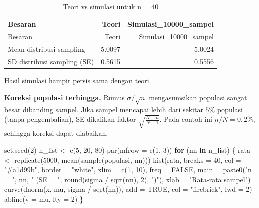 \documentclass[
  indonesian,
  letterpaper,
]{book}
\newenvironment{Shaded}{\begin{snugshade}}{\end{snugshade}}
\newcommand{\AttributeTok}[1]{\textcolor[rgb]{0.40,0.45,0.13}{#1}}
\newcommand{\ConstantTok}[1]{\textcolor[rgb]{0.56,0.35,0.01}{#1}}
\newcommand{\ControlFlowTok}[1]{\textcolor[rgb]{0.00,0.23,0.31}{\textbf{#1}}}
\newcommand{\DecValTok}[1]{\textcolor[rgb]{0.68,0.00,0.00}{#1}}
\newcommand{\FunctionTok}[1]{\textcolor[rgb]{0.28,0.35,0.67}{#1}}
\newcommand{\NormalTok}[1]{\textcolor[rgb]{0.00,0.23,0.31}{#1}}
\newcommand{\OtherTok}[1]{\textcolor[rgb]{0.00,0.23,0.31}{#1}}
\newcommand{\SpecialCharTok}[1]{\textcolor[rgb]{0.37,0.37,0.37}{#1}}
\newcommand{\StringTok}[1]{\textcolor[rgb]{0.13,0.47,0.30}{#1}}
\begin{document}
\begin{longtable}[]{@{}lrr@{}}
\caption{Teori vs simulasi untuk n = 40}\tabularnewline
\toprule\noalign{}
Besaran & Teori & Simulasi\_10000\_sampel \\
\midrule\noalign{}
\endfirsthead
\toprule\noalign{}
Besaran & Teori & Simulasi\_10000\_sampel \\
\midrule\noalign{}
\endhead
\bottomrule\noalign{}
\endlastfoot
Mean distribusi sampling & 5.0097 & 5.0024 \\
SD distribusi sampling (SE) & 0.5615 & 0.5556 \\
\end{longtable}

Hasil simulasi hampir persis sama dengan teori.

\textbf{Koreksi populasi terhingga.} Rumus \(\sigma/\sqrt{n}\)
mengasumsikan populasi sangat besar dibanding sampel. Jika sampel
mencapai lebih dari sekitar \(5\%\) populasi (tanpa pengembalian), SE
dikalikan faktor \(\sqrt{\frac{N-n}{N-1}}\). Pada contoh ini
\(n/N = 0,2\%\), sehingga koreksi dapat diabaikan.

\begin{Shaded}
\begin{Highlighting}[]
\FunctionTok{set.seed}\NormalTok{(}\DecValTok{2}\NormalTok{)}
\NormalTok{n\_list }\OtherTok{\textless{}{-}} \FunctionTok{c}\NormalTok{(}\DecValTok{5}\NormalTok{, }\DecValTok{20}\NormalTok{, }\DecValTok{80}\NormalTok{)}
\FunctionTok{par}\NormalTok{(}\AttributeTok{mfrow =} \FunctionTok{c}\NormalTok{(}\DecValTok{1}\NormalTok{, }\DecValTok{3}\NormalTok{))}
\ControlFlowTok{for}\NormalTok{ (nn }\ControlFlowTok{in}\NormalTok{ n\_list) \{}
\NormalTok{rata }\OtherTok{\textless{}{-}} \FunctionTok{replicate}\NormalTok{(}\DecValTok{5000}\NormalTok{, }\FunctionTok{mean}\NormalTok{(}\FunctionTok{sample}\NormalTok{(populasi, nn)))}
\FunctionTok{hist}\NormalTok{(rata, }\AttributeTok{breaks =} \DecValTok{40}\NormalTok{, }\AttributeTok{col =} \StringTok{"\#a1d99b"}\NormalTok{, }\AttributeTok{border =} \StringTok{"white"}\NormalTok{, }\AttributeTok{xlim =} \FunctionTok{c}\NormalTok{(}\DecValTok{1}\NormalTok{, }\DecValTok{10}\NormalTok{), freq}
\OtherTok{=} \ConstantTok{FALSE}\NormalTok{,}
\AttributeTok{main =} \FunctionTok{paste0}\NormalTok{(}\StringTok{"n = "}\NormalTok{, nn, }\StringTok{" (SE = "}\NormalTok{, }\FunctionTok{round}\NormalTok{(sigma }\SpecialCharTok{/} \FunctionTok{sqrt}\NormalTok{(nn), }\DecValTok{2}\NormalTok{), }\StringTok{")"}\NormalTok{),}
\AttributeTok{xlab =} \StringTok{"Rata{-}rata sampel"}\NormalTok{)}
\FunctionTok{curve}\NormalTok{(}\FunctionTok{dnorm}\NormalTok{(x, mu, sigma }\SpecialCharTok{/} \FunctionTok{sqrt}\NormalTok{(nn)), }\AttributeTok{add =} \ConstantTok{TRUE}\NormalTok{, }\AttributeTok{col =} \StringTok{"firebrick"}\NormalTok{, }\AttributeTok{lwd =} \DecValTok{2}\NormalTok{)}
\FunctionTok{abline}\NormalTok{(}\AttributeTok{v =}\NormalTok{ mu, }\AttributeTok{lty =} \DecValTok{2}\NormalTok{)}
\NormalTok{\}}
\end{Highlighting}
\end{Shaded}
\end{document}
